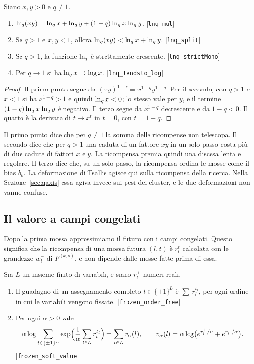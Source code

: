 \begin{proposizione}
\label{prop:tsallis-reward}
Siano $x,y>0$ e $q\ne1$.
\begin{enumerate}
\item $\ln_q(xy)=\ln_q x+\ln_q y+(1-q)\ln_q x\,\ln_q y$. [\texttt{lnq\_mul}]
\item Se $q>1$ e $x,y<1$, allora $\ln_q(xy)<\ln_q x+\ln_q y$. [\texttt{lnq\_split}]
\item Se $q>1$, la funzione $\ln_q$ è strettamente crescente. [\texttt{lnq\_strictMono}]
\item Per $q\to1$ si ha $\ln_q x\to\log x$. [\texttt{lnq\_tendsto\_log}]
\end{enumerate}
\end{proposizione}

\begin{proof}
Il primo punto segue da $(xy)^{1-q}=x^{1-q}y^{1-q}$.
Per il secondo, con $q>1$ e $x<1$ si ha $x^{1-q}>1$ e quindi $\ln_q x<0$; lo stesso vale per $y$, e il termine $(1-q)\ln_q x\,\ln_q y$ è negativo.
Il terzo segue da $x^{1-q}$ decrescente e da $1-q<0$.
Il quarto è la derivata di $t\mapsto x^t$ in $t=0$, con $t=1-q$.
\end{proof}

Il primo punto dice che per $q\ne1$ la somma delle ricompense non telescopa.
Il secondo dice che per $q>1$ una caduta di un fattore $xy$ in un solo passo costa più di due cadute di fattori $x$ e $y$.
La ricompensa premia quindi una discesa lenta e regolare.
Il terzo dice che, su un solo passo, la ricompensa ordina le mosse come il bias $b_k$.
La deformazione di Tsallis agisce qui sulla ricompensa della ricerca.
Nella Sezione~\ref{sec:qaxis} essa agiva invece sui pesi dei cluster, e le due deformazioni non vanno confuse.

\subsection{Il valore a campi congelati}

Dopo la prima mossa approssimiamo il futuro con i campi congelati.
Questo significa che la ricompensa di una mossa futura $(l,t)$ è $r_l^t$ calcolata con le grandezze $w_l^\pm$ di $F^{(k,s)}$, e non dipende dalle mosse fatte prima di essa.

\begin{proposizione}[Fattorizzazione]
\label{prop:frozen}
Sia $L$ un insieme finito di variabili, e siano $r_l^\pm$ numeri reali.
\begin{enumerate}
\item Il guadagno di un assegnamento completo $t\in\{\pm1\}^L$ è $\sum_lr_l^{t_l}$, per ogni ordine in cui le variabili vengono fissate. [\texttt{frozen\_order\_free}]
\item Per ogni $\alpha>0$ vale
\begin{equation}
\alpha\log\sum_{t\in\{\pm1\}^L}\exp\Bigl(\frac1\alpha\sum_{l\in L}r_l^{t_l}\Bigr)=\sum_{l\in L}v_\alpha(l),\qquad
v_\alpha(l)=\alpha\log\bigl(e^{r_l^+/\alpha}+e^{r_l^-/\alpha}\bigr).
\label{eq:frozen-value}
\end{equation}
[\texttt{frozen\_soft\_value}]
\end{enumerate}
\end{proposizione}

